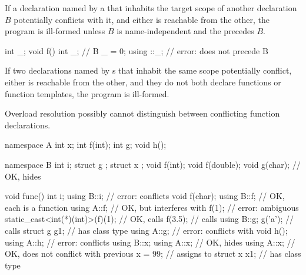 \pnum
If a declaration named by a 
that inhabits the target scope of another declaration $B$
potentially conflicts with it, and
either is reachable from the other, the program is ill-formed
unless $B$ is name-independent and
the  precedes $B$.
\begin{example}
\begin{codeblock}
int _;
void f() {
  int _;                // B
  _ = 0;
  using ::_;            // error:  does not precede B
}
\end{codeblock}
\end{example}
If two declarations named by s
that inhabit the same scope potentially conflict,
either is reachable from the other, and
they do not both declare functions or function templates,
the program is ill-formed.
\begin{note}
Overload resolution possibly cannot distinguish
between conflicting function declarations.
\end{note}
\begin{example}
\begin{codeblock}
namespace A {
  int x;
  int f(int);
  int g;
  void h();
}

namespace B {
  int i;
  struct g { };
  struct x { };
  void f(int);
  void f(double);
  void g(char);                         // OK, hides 
}

void func() {
  int i;
  using B::i;                           // error: conflicts
  void f(char);
  using B::f;                           // OK, each  is a function
  using A::f;                           // OK, but interferes with 
  f(1);                                 // error: ambiguous
  static_cast<int(*)(int)>(f)(1);       // OK, calls 
  f(3.5);                               // calls 
  using B::g;
  g('a');                               // calls 
  struct g g1;                          //  has class type 
  using A::g;                           // error: conflicts with 
  void h();
  using A::h;                           // error: conflicts
  using B::x;
  using A::x;                           // OK, hides 
  using A::x;                           // OK, does not conflict with previous 
  x = 99;                               // assigns to 
  struct x x1;                          //  has class type 
}
\end{codeblock}
\end{example}

